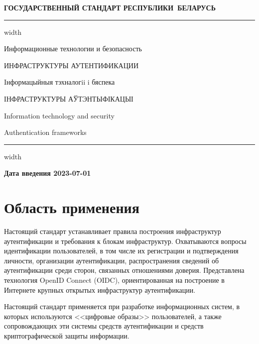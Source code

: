 \newpage
\setcounter{page}{1}
\pagestyle{headings}

\begin{center}
{\bfseries
ГОСУДАРСТВЕННЫЙ СТАНДАРТ РЕСПУБЛИКИ~БЕЛАРУСЬ
\vskip 2pt
\hrule width\textwidth

\vskip 9pt

Информационные технологии и безопасность

ИНФРАСТРУКТУРЫ АУТЕНТИФИКАЦИИ

\vskip 9pt

Iнформацыйныя тэхналогii i бяспека

ІНФРАСТРУКТУРЫ АЎТЭНТЫФІКАЦЫІ
}

\vskip 9pt

Information technology and security

Authentication frameworks

\vskip 4pt                
\hrule width \textwidth
\end{center}

\mbox{}\hfill{\bfseries Дата введения 2023-07-01}

\chapter{Область применения}\label{Scope}

Настоящий стандарт устанавливает правила построения инфраструктур 
аутентификации и требования к блокам инфраструктур. 
%        
Охватываются вопросы идентификации пользователей, в том числе их регистрации и
подтверждения личности, организации аутентификации, распространения сведений об
аутентификации среди сторон, связанных отношениями доверия.
%
Представлена технология OpenID Connect (OIDC), ориентированная на построение
в Интернете крупных открытых инфраструктур аутентификации.

Настоящий стандарт применяется при разработке информационных систем,
в которых используются <<цифровые образы>> пользователей, а также 
сопровождающих эти системы средств аутентификации и средств криптографической 
защиты информации.

